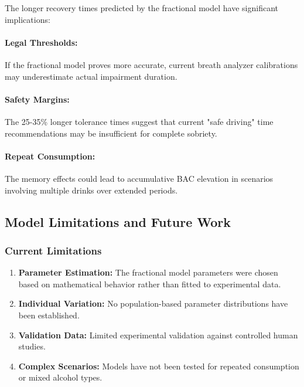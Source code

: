 \documentclass[12pt]{article}
\begin{document}
The longer recovery times predicted by the fractional model have significant implications:

\paragraph{Legal Thresholds:} If the fractional model proves more accurate, current breath analyzer calibrations may underestimate actual impairment duration.

\paragraph{Safety Margins:} The 25-35\% longer tolerance times suggest that current "safe driving" time recommendations may be insufficient for complete sobriety.

\paragraph{Repeat Consumption:} The memory effects could lead to accumulative BAC elevation in scenarios involving multiple drinks over extended periods.

\subsection{Model Limitations and Future Work}

\subsubsection{Current Limitations}

\begin{enumerate}
    \item \textbf{Parameter Estimation:} The fractional model parameters were chosen based on mathematical behavior rather than fitted to experimental data.
    
    \item \textbf{Individual Variation:} No population-based parameter distributions have been established.
    
    \item \textbf{Validation Data:} Limited experimental validation against controlled human studies.
    
    \item \textbf{Complex Scenarios:} Models have not been tested for repeated consumption or mixed alcohol types.
\end{enumerate}
\end{document}
